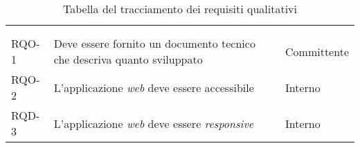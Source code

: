 \begin{center}
  {
    \renewcommand{\arraystretch}{1}
    \begin{longtable}{
      |>{\centering\arraybackslash}p{60pt}
      |>{\centering\arraybackslash}p{220pt}
      |>{\centering\arraybackslash}p{60pt}|}

      \rowcolor{antimaincolor!0}
      \caption{\label{tab:requisiti-qualitativi}Tabella del tracciamento dei
      requisiti qualitativi}                                                                     \\

      \hline
      \rowcolor{maincolor}
      \color{antimaincolor}{Requisito}
                                 &
      \color{antimaincolor}{Descrizione}
                                 &
      \color{antimaincolor}{Fonte}
      \\
      \hline
      \endhead

      \rowcolor{maincolor}
      \color{antimaincolor}{Requisito}
                                 &
      \color{antimaincolor}{Descrizione}
                                 &
      \color{antimaincolor}{Fonte}
      \\
      \hline
      \endfoot
      RQO-1                      & Deve essere fornito un documento tecnico che
      descriva quanto sviluppato & Committente                                                   \\
      \hline

      RQO-2                      & L'applicazione \textit{web} deve essere accessibile         &
      Interno                                                                                    \\
      \hline

      RQD-3                      & L'applicazione \textit{web} deve essere \textit{responsive}
                                 & Interno                                                       \\
      \hline

    \end{longtable}
    \renewcommand{\arraystretch}{1}
  }

\end{center}